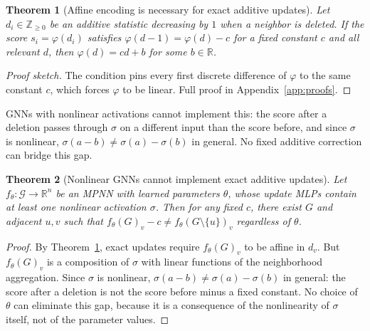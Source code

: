 \documentclass[11pt]{article}
\theoremstyle{plain}
\newtheorem{theorem}{Theorem}[section]
\theoremstyle{remark}
\newtheorem{remark}[theorem]{Remark}
\begin{document}
\begin{theorem}[Affine encoding is necessary for exact additive updates]
  \label{thm:affine}
  Let $d_i \in \mathbb{Z}_{\geq 0}$ be an additive statistic decreasing by $1$ when
  a neighbor is deleted. If the score $s_i = \varphi(d_i)$ satisfies
  $\varphi(d-1) = \varphi(d) - c$ for a fixed constant $c$ and all relevant $d$,
  then $\varphi(d) = cd + b$ for some $b \in \mathbb{R}$.
\end{theorem}
\begin{proof}[Proof sketch]
  The condition pins every first discrete difference of $\varphi$ to the same
  constant $c$, which forces $\varphi$ to be linear. Full proof in
  Appendix~\ref{app:proofs}.
\end{proof}


GNNs with nonlinear activations cannot implement this: the score after a deletion
passes through $\sigma$ on a different input than the score before, and since
$\sigma$ is nonlinear, $\sigma(a - b) \neq \sigma(a) - \sigma(b)$ in general.
No fixed additive correction can bridge this gap.

\begin{theorem}[Nonlinear GNNs cannot implement exact additive updates]
  \label{thm:nonlinear}
  Let $f_\theta\colon\mathcal{G}\to\mathbb{R}^n$ be an MPNN with learned parameters
  $\theta$, whose update MLPs contain at least one nonlinear activation $\sigma$. Then for any fixed $c$,
  there exist $G$ and adjacent $u,v$ such that $f_\theta(G)_v - c \neq
  f_\theta(G\setminus\{u\})_v$ regardless of $\theta$.
\end{theorem}
\begin{proof}
  By Theorem~\ref{thm:affine}, exact updates require $f_\theta(G)_v$ to be affine
  in $d_v$. But $f_\theta(G)_v$ is a composition of $\sigma$ with linear
  functions of the neighborhood aggregation. Since $\sigma$ is nonlinear,
  $\sigma(a - b) \neq \sigma(a) - \sigma(b)$ in general: the score after a
  deletion is not the score before minus a fixed constant. No choice of $\theta$
  can eliminate this gap, because it is a consequence of the nonlinearity of
  $\sigma$ itself, not of the parameter values.
\end{proof}


\end{document}
